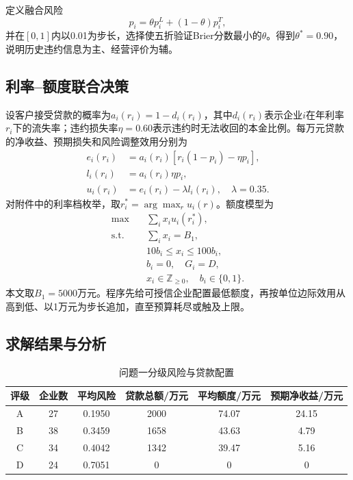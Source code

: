 \documentclass[UTF8,a4paper,12pt,fontset=fandol]{ctexart}
\numberwithin{equation}{section}
\begin{document}
定义融合风险
\begin{equation}
p_i=\theta p_i^L+(1-\theta)p_i^T,
\end{equation}
并在$[0,1]$内以0.01为步长，选择使五折验证Brier分数最小的$\theta$。得到$\theta^*=0.90$，说明历史违约信息为主、经营评价为辅。

\subsection{利率--额度联合决策}

设客户接受贷款的概率为$a_i(r_i)=1-d_i(r_i)$，其中$d_i(r_i)$表示企业$i$在年利率$r_i$下的流失率；违约损失率$\eta=0.60$表示违约时无法收回的本金比例。每万元贷款的净收益、预期损失和风险调整效用分别为
\begin{align}
e_i(r_i)&=a_i(r_i)[r_i(1-p_i)-\eta p_i],\\
l_i(r_i)&=a_i(r_i)\eta p_i,\\
u_i(r_i)&=e_i(r_i)-\lambda l_i(r_i),\quad \lambda=0.35.
\end{align}
对附件中的利率档枚举，取$r_i^*=\arg\max_r u_i(r)$。额度模型为
\begin{align}
\max\quad &\sum_i x_i u_i(r_i^*),\\
\text{s.t.}\quad&\sum_i x_i=B_1,\\
&10b_i\le x_i\le100b_i,\\
&b_i=0,\quad G_i=D,\\
&x_i\in\mathbb Z_{\ge0},\quad b_i\in\{0,1\}.
\end{align}
本文取$B_1=5000$万元。程序先给可授信企业配置最低额度，再按单位边际效用从高到低、以1万元为步长追加，直至预算耗尽或触及上限。

\subsection{求解结果与分析}

\begin{table}[H]
\centering
\caption{问题一分级风险与贷款配置}
\label{tab:q1}
\begin{tabular}{cccccc}
\toprule
评级 & 企业数 & 平均风险 & 贷款总额/万元 & 平均额度/万元 & 预期净收益/万元\\
\midrule
A & 27 & 0.1950 & 2000 & 74.07 & 24.15\\
B & 38 & 0.3459 & 1658 & 43.63 & 4.79\\
C & 34 & 0.4042 & 1342 & 39.47 & 5.16\\
D & 24 & 0.7051 & 0 & 0 & 0\\
\bottomrule
\end{tabular}
\end{table}
\end{document}
